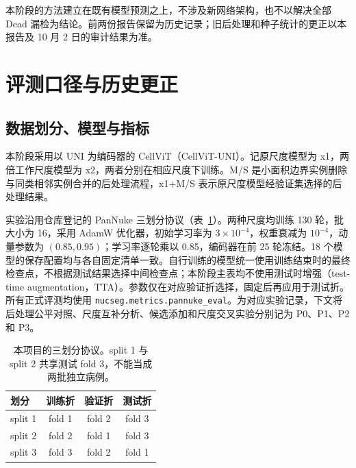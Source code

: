 \documentclass[11pt,a4paper,UTF8,fontset=fandol]{ctexart}
\newcommand{\code}[1]{\nolinkurl{#1}}
\begin{document}
本阶段的方法建立在既有模型预测之上，不涉及新网络架构，也不以解决全部 Dead 漏检为结论。前两份报告保留为历史记录；旧后处理和种子统计的更正以本报告及 10 月 2 日的审计结果为准\cite{p0p3}。

\section{评测口径与历史更正}

\subsection{数据划分、模型与指标}

本阶段采用以 UNI\cite{uni} 为编码器的 CellViT\cite{cellvit}（CellViT-UNI）。记原尺度模型为 x1，两倍工作尺度模型为 x2，两者分别在相应尺度下训练。M/S 是小面积边界实例删除与同类相邻实例合并的后处理流程，x1+M/S 表示原尺度模型经验证集选择的后处理结果。

实验沿用仓库登记的 PanNuke 三划分协议（表~\ref{tab:splits}）。两种尺度均训练 130 轮，批大小为 16，采用 AdamW 优化器，初始学习率为 $3\times10^{-4}$，权重衰减为 $10^{-4}$，动量参数为 $(0.85,0.95)$；学习率逐轮乘以 0.85，编码器在前 25 轮冻结。18 个模型的保存配置均与各自固定清单一致。自行训练的模型统一使用训练结束时的最终检查点，不根据测试结果选择中间检查点；本阶段主表均不使用测试时增强（test-time augmentation，TTA）。参数仅在对应验证折选择，固定后再应用于测试折。所有正式评测均使用 \code{nucseg.metrics.pannuke_eval}。为对应实验记录，下文将后处理公平对照、尺度互补分析、候选添加和尺度交叉实验分别记为 P0、P1、P2 和 P3。

\begin{table}[H]
\centering\small
\caption{本项目的三划分协议。split 1 与 split 2 共享测试 fold 3，不能当成两批独立病例。}
\label{tab:splits}
\begin{tabular}{lccc}\toprule
划分 & 训练折 & 验证折 & 测试折\\\midrule
split 1 & fold 1 & fold 2 & fold 3\\
split 2 & fold 2 & fold 1 & fold 3\\
split 3 & fold 3 & fold 2 & fold 1\\\bottomrule
\end{tabular}
\end{table}
\end{document}
